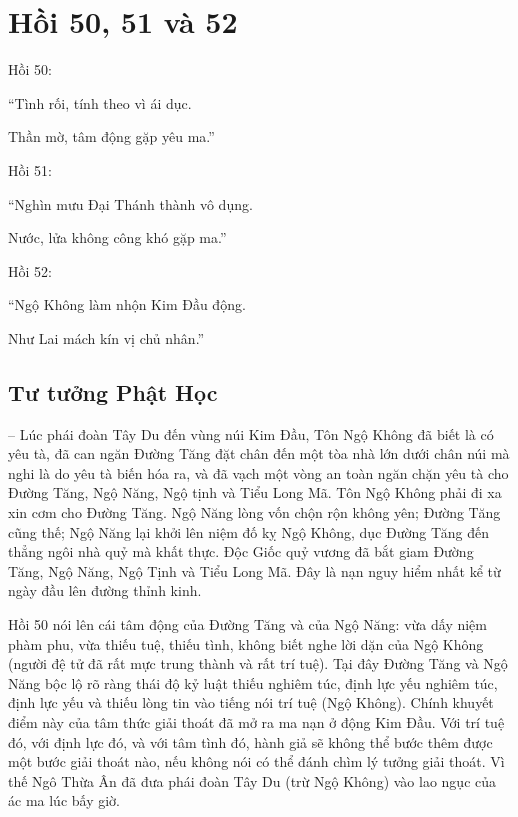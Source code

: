 \chapter{Hồi 50, 51 và 52} %
\label{cha:hoi_50_51}

Hồi 50:

\begin{itshape}
``Tình rối, tính theo vì ái dục.

Thần mờ, tâm động gặp yêu ma.''
\end{itshape}

Hồi 51:

\begin{itshape}
``Nghìn mưu Đại Thánh thành vô dụng.

Nước, lửa không công khó gặp ma.''
\end{itshape}

Hồi 52:

\begin{itshape}
``Ngộ Không làm nhộn Kim Đầu động.

Như Lai mách kín vị chủ nhân.''
\end{itshape}

\section{Tư tưởng Phật Học} %
\label{sec:50_51_phat_hoc}

-- Lúc phái đoàn Tây Du đến vùng núi Kim Đầu, Tôn Ngộ Không đã biết là có yêu tà, đã can ngăn Đường Tăng đặt chân đến một tòa nhà lớn dưới chân núi mà nghi là do yêu tà biến hóa ra, và đã vạch một vòng an toàn ngăn chặn yêu tà cho Đường Tăng, Ngộ Năng, Ngộ tịnh và Tiểu Long Mã. Tôn Ngộ Không phải đi xa xin cơm cho Đường Tăng. Ngộ Năng lòng vốn chộn rộn không yên; Đường Tăng cũng thế; Ngộ Năng lại khởi lên niệm đố kỵ Ngộ Không, dục Đường Tăng đến thẳng ngôi nhà quỷ mà khất thực. Độc Giốc quỷ vương đã bắt giam Đường Tăng, Ngộ Năng, Ngộ Tịnh và Tiểu Long Mã. Đây là nạn nguy hiểm nhất kể từ ngày đầu lên đường thỉnh kinh.

Hồi 50 nói lên cái tâm động của Đường Tăng và của Ngộ Năng: vừa dấy niệm phàm phu, vừa thiếu tuệ, thiếu tình, không biết nghe lời dặn của Ngộ Không (người đệ tử đã rất mực trung thành và rất trí tuệ). Tại đây Đường Tăng và Ngộ Năng bộc lộ rõ ràng thái độ kỷ luật thiếu nghiêm túc, định lực yếu nghiêm túc, định lực yếu và thiếu lòng tin vào tiếng nói trí tuệ (Ngộ Không). Chính khuyết điểm này của tâm thức giải thoát đã mở ra ma nạn ở động Kim Đầu. Với trí tuệ đó, với định lực đó, và với tâm tình đó, hành giả sẽ không thể bước thêm được một bước giải thoát nào, nếu không nói có thể đánh chìm lý tưởng giải thoát. Vì thế Ngô Thừa Ân đã đưa phái đoàn Tây Du (trừ Ngộ Không) vào lao ngục của ác ma lúc bấy giờ.

